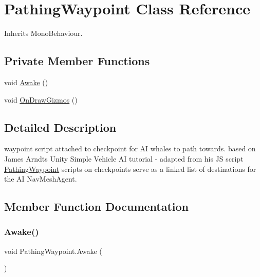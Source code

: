 \hypertarget{class_pathing_waypoint}{}\section{Pathing\+Waypoint Class Reference}
\label{class_pathing_waypoint}


Inherits Mono\+Behaviour.

\subsection*{Private Member Functions}
\begin{DoxyCompactItemize}
\item 
void \hyperlink{class_pathing_waypoint_abb4c98b5302912d1bd0d86e313991bda}{Awake} ()
\item 
void \hyperlink{class_pathing_waypoint_a65bdda3cb83eb83737a14545032c29d9}{On\+Draw\+Gizmos} ()
\end{DoxyCompactItemize}


\subsection{Detailed Description}
waypoint script attached to checkpoint for AI whales to path towards. based on James Arndt\textquotesingle{}s Unity Simple Vehicle AI tutorial -\/ adapted from his JS script \hyperlink{class_pathing_waypoint}{Pathing\+Waypoint} scripts on checkpoints serve as a \textquotesingle{}linked list\textquotesingle{} of destinations for the AI Nav\+Mesh\+Agent. 



\subsection{Member Function Documentation}
\mbox{\label{class_pathing_waypoint_abb4c98b5302912d1bd0d86e313991bda}} 
\subsubsection{\texorpdfstring{Awake()}{Awake()}}
{\footnotesize\ttfamily void Pathing\+Waypoint.\+Awake (\begin{DoxyParamCaption}{ }\end{DoxyParamCaption})\hspace{0.3cm}{\ttfamily [private]}}



